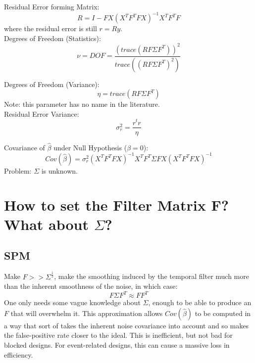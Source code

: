 \documentclass{article}
\begin{document}
\noindent
Residual Error forming Matrix:
\begin{equation}
R = I - F X (X^T F^T F X)^{-1}  X^T F^T  F
\end{equation}
where the residual error is still $r = Ry$.\\

\noindent
Degrees of Freedom (Statistics):
\begin{equation}
\nu = DOF = \frac{(trace(R F \Sigma F^T))^2} {trace((R F \Sigma F^T)^2)}
\end{equation}

\noindent
Degrees of Freedom (Variance):
\begin{equation}
\eta = trace(R F \Sigma F^T)
\end{equation}
Note: this parameter has no name in the literature.\\

\noindent
Residual Error Variance:
\begin{equation}
\sigma_r^2 = \frac{r^t r}{\eta} 
\end{equation}

\noindent
Covariance of $\hat{\beta}$ under Null Hypothesis ($\beta = 0$):
\begin{equation}
Cov(\hat{\beta}) = 
\sigma_r^2 (X^T F^T F X)^{-1}  X^T F^T \Sigma F X (X^T F^T F X)^{-1} 
\end{equation}
Problem: $\Sigma$ is unknown.

\section{How to set the Filter Matrix F? What about $\Sigma$?}

\subsection{SPM}

\noindent
Make $F >> \Sigma^{\frac{1}{2}}$, make the smoothing induced by the
temporal filter much more than the inherent smoothness of the noise,
in which case:
\begin{equation}
F \Sigma F^T \approx F F^T
\end{equation}
One only needs some vague knowledge about $\Sigma$, enough to be able
to produce an $F$ that will overwhelm it.  This approximation allows
$Cov(\hat\beta)$ to be computed in a way that sort of takes the
inherent noise covariance into account and so makes the false-positive
rate closer to the ideal. This is inefficient, but not bad for blocked
designs. For event-related designs, this can cause a massive loss in
efficiency. 
\end{document}
